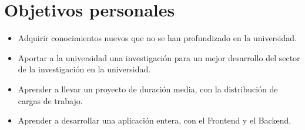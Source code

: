 \section{Objetivos personales}
\begin{itemize}

	\item Adquirir conocimientos nuevos que no se han profundizado en la universidad.
	
	\item Aportar a la universidad una investigación para un mejor desarrollo del sector de la investigación en la universidad.
	 
	\item Aprender a llevar un proyecto de duración media, con la distribución de cargas de trabajo.
	 
	\item Aprender a desarrollar una aplicación entera, con el Frontend y el Backend.
	 
\end{itemize}
